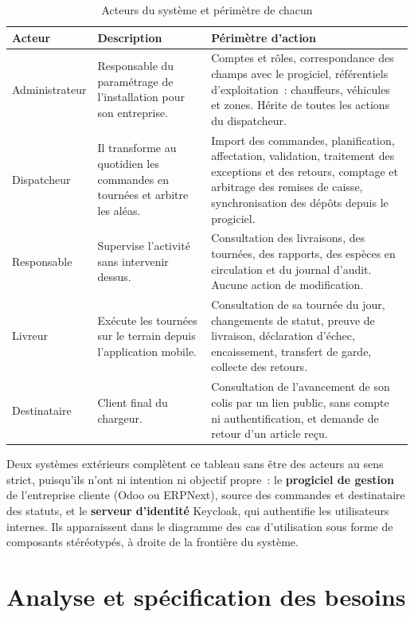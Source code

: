 \begin{table}[H]
\centering
\caption{Acteurs du système et périmètre de chacun}
\label{tab:acteurs}
\begin{tabular}{L{3.1cm}L{5.2cm}L{6.2cm}}
\hline
{}
\textbf{Acteur} & \textbf{Description} & \textbf{Périmètre d'action} \\
\hline
Administrateur & Responsable du paramétrage de l'installation pour son entreprise. &
Comptes et rôles, correspondance des champs avec le progiciel, référentiels d'exploitation~:
chauffeurs, véhicules et zones. Hérite de toutes les actions du dispatcheur. \\
\hline
Dispatcheur & Il transforme au quotidien les commandes en tournées et arbitre les aléas. & Import des commandes, planification, affectation, validation, traitement des exceptions et
des retours, comptage et arbitrage des remises de caisse, synchronisation des dépôts depuis le
progiciel. \\
\hline
Responsable & Supervise l'activité sans intervenir dessus. &
Consultation des livraisons, des tournées, des rapports, des espèces en circulation et du journal
d'audit. Aucune action de modification. \\
\hline
Livreur & Exécute les tournées sur le terrain depuis l'application mobile. &
Consultation de sa tournée du jour, changements de statut, preuve de livraison, déclaration d'échec,
encaissement, transfert de garde, collecte des retours. \\
\hline
Destinataire & Client final du chargeur. &
Consultation de l'avancement de son colis par un lien public, sans compte ni authentification, et
demande de retour d'un article reçu. \\
\hline
\end{tabular}
\end{table}

Deux systèmes extérieurs complètent ce tableau sans être des acteurs au sens strict, puisqu'ils
n'ont ni intention ni objectif propre~: le \textbf{progiciel de gestion} de l'entreprise cliente
(Odoo ou ERPNext), source des commandes et destinataire des statuts, et le \textbf{serveur
d'identité} Keycloak, qui authentifie les utilisateurs internes. Ils apparaissent dans le diagramme
des cas d'utilisation sous forme de composants stéréotypés, à droite de la frontière du système.

\section{Analyse et spécification des besoins}
\label{sec:besoins}

